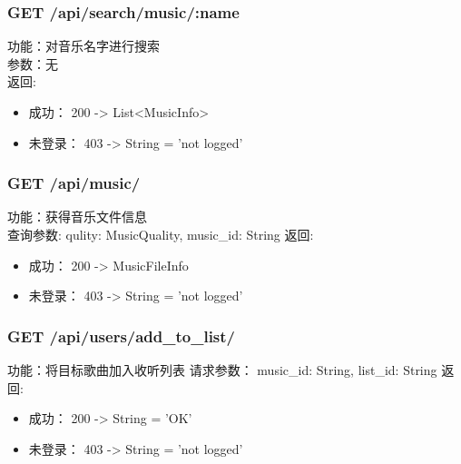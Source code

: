 \subsubsection{GET /api/search/music/:name}

\noindent
功能：对音乐名字进行搜索\\
参数：无\\
返回:
\begin{itemize}
	\item 成功： 200 -> List<MusicInfo>
	\item 未登录： 403 -> String = 'not logged'
\end{itemize}

\iffalse
\R{
	\subsubsection{GET /api/music\_recommend/}
	\noindent
	功能：获得音乐文件信息\\
	参数: 无\\
	返回:
	\begin{itemize}
		\item 成功： 200 -> MusicFileInfo
		\item 未登录： 403 -> String = 'not logged in'
	\end{itemize}
}
\fi

\subsubsection{GET /api/music/}

\noindent
功能：获得音乐文件信息\\
查询参数: qulity: MusicQuality, music\_id: String
返回:
\begin{itemize}
	\item 成功： 200 -> MusicFileInfo
	\item 未登录： 403 -> String = 'not logged'
\end{itemize}


\subsubsection{GET /api/users/add\_to\_list/}

\noindent
功能：将目标歌曲加入收听列表
请求参数： music\_id: String, list\_id: String
返回:
\begin{itemize}
	\item 成功： 200 -> String = 'OK'
	\item 未登录： 403 -> String = 'not logged'
\end{itemize}


